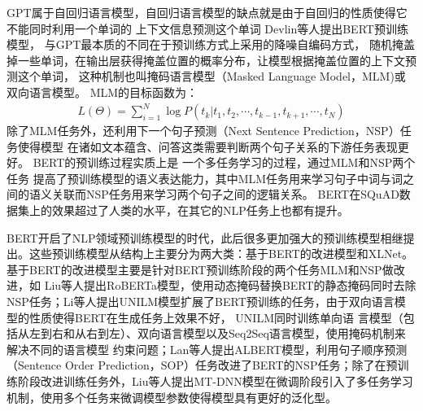 GPT属于自回归语言模型，自回归语言模型的缺点就是由于自回归的性质使得它不能同时利用一个单词的
上下文信息预测这个单词
Devlin等人\cite{BERT}提出BERT预训练模型，
与GPT最本质的不同在于预训练方式上采用的降噪自编码方式，
随机掩盖
掉一些单词，在输出层获得掩盖位置的概率分布，让模型根据掩盖位置的上下文预测这个单词，
这种机制也叫掩码语言模型（Masked Language Model，MLM)或双向语言模型。
MLM的目标函数为：
\begin{equation}
    \begin{split}
        L(\Theta)=\sum_{i=1}^{N}\log P(t_k|t_1,t_2,\cdots,t_{k-1},t_{k+1},\cdots,t_{N})
    \end{split}
\end{equation}
除了MLM任务外，还利用下一个句子预测（Next Sentence Prediction，NSP）任务使得模型
在诸如文本蕴含、问答这类需要判断两个句子关系的下游任务表现更好。
BERT的预训练过程实质上是
一个多任务学习的过程，通过MLM和NSP两个任务
提高了预训练模型的语义表达能力，其中MLM任务用来学习句子中词与词之间的语义关联而NSP任务用来学习两个句子之间的逻辑关系。
BERT在SQuAD数据集上的效果超过了人类的水平，在其它的NLP任务上也都有提升。

BERT开启了NLP领域预训练模型的时代，此后很多更加强大的预训练模型相继提出。这些预训练模型从结构上主要分为两大类：基于BERT的改进模型和XLNet。基于BERT的改进模型主要是针对BERT预训练阶段的两个任务MLM和NSP做改进，如
Liu等人提出RoBERTa模型，使用动态掩码替换BERT的静态掩码同时去除NSP任务；Li等人提出UNILM模型扩展了BERT预训练的任务，由于双向语言模型的性质使得BERT在生成任务上效果不好，
UNILM同时训练单向语
言模型（包括从左到右和从右到左）、双向语言模型以及Seq2Seq语言模型，使用掩码机制来解决不同的语言模型
约束问题；Lan等人提出ALBERT模型，利用句子顺序预测（Sentence Order Prediction，SOP）任务改进了BERT的NSP任务；除了在预训练阶段改进训练任务外，Liu等人提出MT-DNN模型在微调阶段引入了多任务学习机制，使用多个任务来微调模型参数使得模型具有更好的泛化型。

